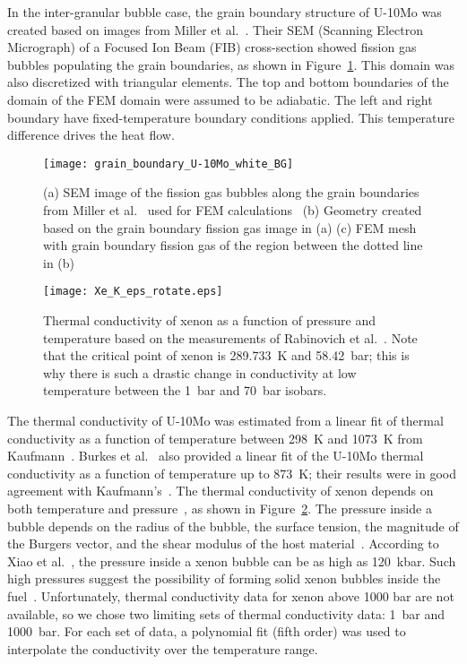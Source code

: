 In the inter-granular bubble case, the grain boundary structure of U-10Mo was created based on images from Miller et al.~\cite{miller2012advantages}. Their SEM (Scanning Electron Micrograph) of a Focused Ion Beam (FIB) cross-section showed fission gas bubbles populating the grain boundaries, as shown in Figure~\ref{fig_Xe_SEM}. This domain was also discretized with triangular elements. The top and bottom boundaries of the domain of the FEM domain were assumed to be adiabatic. The left and right boundary have fixed-temperature boundary conditions applied. This temperature difference drives the heat flow. 


\begin{figure}%
\centering
\texttt{[image: grain\_boundary\_U-10Mo\_white\_BG]}
\caption[SEM image of the fission gas bubbles along the grain boundary]{(a) SEM image of the fission gas bubbles along the grain boundaries from Miller et al.~\cite{miller2012advantages} used for FEM calculations~\cite{miller2012advantages} (b) Geometry created based on the grain boundary fission gas image in (a) (c) FEM mesh with grain boundary fission gas of the region between the dotted line in  (b) }
\label{fig_Xe_SEM}
\end{figure}
\begin{figure}
\centering
\texttt{[image: Xe\_K\_eps\_rotate.eps]}
\caption[Thermal conductivity of xenon as a function of pressure and temperature]{Thermal conductivity of xenon as a function of pressure and
temperature based on the measurements of
Rabinovich et al.~\cite{rabinovich1987thermophysical}.
Note that the critical point of xenon is 289.733~K and 58.42~bar; this is why
there is such a drastic change in conductivity at low temperature between the
1~bar and 70~bar isobars.}
\label{fig_Xe_pressure}
\end{figure}

The thermal conductivity of U-10Mo was estimated from a linear fit of thermal conductivity as a function of temperature between 298~K and 1073~K from Kaufmann~\cite{kaufmann1962nuclear}. Burkes et al.~\cite{burkes2010thermo} also provided a linear fit of the U-10Mo thermal conductivity as a function of temperature up to 873~K; their results were in good agreement with Kaufmann's~\cite{kaufmann1962nuclear}. The thermal conductivity of xenon depends on both temperature and pressure~\cite{rabinovich1987thermophysical}, as shown in Figure~\ref{fig_Xe_pressure}. The pressure inside a bubble depends on the radius of the bubble, the surface tension, the magnitude of the Burgers vector, and the shear modulus of the host material~\cite{greenwood1959role,trinkaus1983energetics}. According to Xiao et al.~\cite{xiao2015atomistic}, the pressure inside a xenon bubble can be as high as 120~kbar. Such high pressures suggest the possibility of forming solid xenon bubbles inside the fuel~\cite{thomas1991condensed,ross1980condensed,zheng2014thermodynamics}. Unfortunately, thermal conductivity data for xenon above 1000 bar are not available, so we chose two limiting sets of thermal conductivity data: 1~bar and 1000~bar. For each set of data, a polynomial fit (fifth order) was used to interpolate the conductivity over the temperature range.

